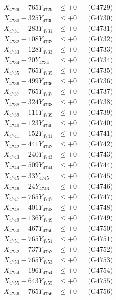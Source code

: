 \documentclass[a4paper,10pt]{article}
\begin{document}
{\begin{align}
X_{4729} - 765Y_{4729} &\leq +0 && \text{(G4729)} \\
X_{4730} - 325Y_{4730} &\leq +0 && \text{(G4730)} \\
\allowbreak
X_{4731} - 283Y_{4731} &\leq +0 && \text{(G4731)} \\
X_{4732} - 108Y_{4732} &\leq +0 && \text{(G4732)} \\
X_{4733} - 128Y_{4733} &\leq +0 && \text{(G4733)} \\
X_{4734} - 20Y_{4734} &\leq +0 && \text{(G4734)} \\
X_{4735} - 765Y_{4735} &\leq +0 && \text{(G4735)} \\
X_{4736} - 499Y_{4736} &\leq +0 && \text{(G4736)} \\
X_{4737} - 765Y_{4737} &\leq +0 && \text{(G4737)} \\
X_{4738} - 324Y_{4738} &\leq +0 && \text{(G4738)} \\
X_{4739} - 111Y_{4739} &\leq +0 && \text{(G4739)} \\
X_{4740} - 123Y_{4740} &\leq +0 && \text{(G4740)} \\
\allowbreak
X_{4741} - 152Y_{4741} &\leq +0 && \text{(G4741)} \\
X_{4742} - 441Y_{4742} &\leq +0 && \text{(G4742)} \\
X_{4743} - 240Y_{4743} &\leq +0 && \text{(G4743)} \\
X_{4744} - 509Y_{4744} &\leq +0 && \text{(G4744)} \\
X_{4745} - 33Y_{4745} &\leq +0 && \text{(G4745)} \\
X_{4746} - 24Y_{4746} &\leq +0 && \text{(G4746)} \\
X_{4747} - 765Y_{4747} &\leq +0 && \text{(G4747)} \\
X_{4748} - 401Y_{4748} &\leq +0 && \text{(G4748)} \\
X_{4749} - 136Y_{4749} &\leq +0 && \text{(G4749)} \\
X_{4750} - 467Y_{4750} &\leq +0 && \text{(G4750)} \\
\allowbreak
X_{4751} - 765Y_{4751} &\leq +0 && \text{(G4751)} \\
X_{4752} - 737Y_{4752} &\leq +0 && \text{(G4752)} \\
X_{4753} - 765Y_{4753} &\leq +0 && \text{(G4753)} \\
X_{4754} - 196Y_{4754} &\leq +0 && \text{(G4754)} \\
X_{4755} - 643Y_{4755} &\leq +0 && \text{(G4755)} \\
X_{4756} - 765Y_{4756} &\leq +0 && \text{(G4756)} \\

\end{align}}
\end{document}
